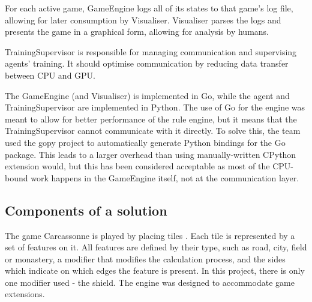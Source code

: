 For each active game, GameEngine logs all of its states to that game's log file,
allowing for later consumption by Visualiser. Visualiser parses the logs
and presents the game in a graphical form, allowing for analysis by humans.

TrainingSupervisor is responsible for managing communication and supervising agents' training.
It should optimise communication by reducing data transfer between CPU and GPU.

The GameEngine (and Visualiser) is implemented in Go, while the agent and TrainingSupervisor
are implemented in Python. The use of Go for the engine was meant to allow for better performance of
the rule engine, but it means that the TrainingSupervisor cannot communicate with it directly.
To solve this, the team used the gopy project \cite{gopy} to automatically generate
Python bindings \cite{LanguageBindings} for the Go package. This leads to a larger overhead than
using manually-written CPython extension would, but this has been considered acceptable as most of
the CPU-bound work happens in the GameEngine itself, not at the communication layer.

\subsection{Components of a solution}

The game Carcassonne is played by placing tiles \cite{CarcassoneRules}. Each tile is represented by a set of features on it. All features are defined by their type, such as road, city, field or monastery, a modifier that modifies the calculation process, and the sides which indicate on which edges the feature is present. In this project, there is only one modifier used - the shield. The engine was designed to accommodate game extensions.

